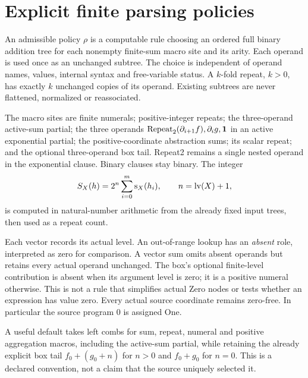 \section{Explicit finite parsing policies}

\begin{definition}
An admissible policy $\rho$ is a computable rule choosing an ordered full
binary addition tree for each nonempty finite-sum macro site and its
arity. Each operand is used once as an unchanged subtree. The choice is
independent of operand names, values, internal syntax and free-variable
status. A $k$-fold repeat, $k>0$, has exactly $k$ unchanged copies of
its operand. Existing subtrees are never flattened, normalized or
reassociated.
\end{definition}

The macro sites are finite numerals; positive-integer repeats; the
three-operand active-sum partial; the three operands
$\operatorname{Repeat}_2(\partial_{i+1}f),\partial_i g,\mathbf1$ in an active exponential partial;
the positive-coordinate abstraction sums; its scalar repeat; and the
optional three-operand box tail. Repeat2 remains a single nested
operand in the exponential clause. Binary clauses stay binary. The
integer
\[
 S_X(h)=2^n\sum_{i=0}^m\operatorname{s}_X(h_i),
 \qquad n=\operatorname{lv}(X)+1,
\]
is computed in natural-number arithmetic from the already fixed input
trees, then used as a repeat count.

Each vector records its actual level. An out-of-range lookup has an
\emph{absent} role, interpreted as zero for comparison. A vector sum
omits absent operands but retains every actual operand unchanged. The
box's optional finite-level contribution is absent when its argument
level is zero; it is a positive numeral otherwise. This is not a rule
that simplifies actual Zero nodes or tests whether an expression has
value zero. Every actual source coordinate remains zero-free. In
particular the source program $0$ is assigned One.

A useful default takes left combs for sum, repeat, numeral and positive
aggregation macros, including the active-sum partial, while retaining
the already explicit box tail $f_0+(g_0+n)$ for $n>0$ and $f_0+g_0$
for $n=0$. This is a declared convention, not a claim that the source
uniquely selected it.

